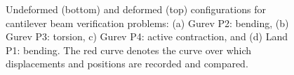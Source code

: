 \begin{figure}[ht]
%
\caption{Undeformed (bottom) and deformed (top) configurations for cantilever beam verification problems: (a) Gurev P2: bending, (b) Gurev P3: torsion, c) Gurev P4: active contraction, and (d) Land P1: bending. The red curve denotes the curve over which displacements and positions are recorded and compared.}
\label{fig:beams}
\end{figure}

